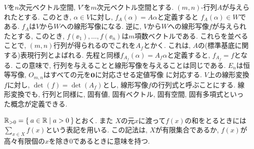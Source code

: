 $V$を$n$次元ベクトル空間, $V'$を$m$次元ベクトル空間とする.
$(m,n)$-行列$A$が与えられたとする.
このとき, $\alpha\in V$に対し, $f_A(\alpha)=A\alpha$と定義すると
$f_A(\alpha)\in W$である.
$f_A$は$V$から$W$への線形写像になる.
逆に,
$V$から$W$への線形写像$f$が与えられたとする,
このとき, $f(\ee_1),\ldots, f(\ee_n)$は$m$項数ベクトルである.
これらを並べることで, $(m,n)$行列が得られるのでこれを$A_f$とかく.
これは, $A$の(標準基底に関する)表現行列とよばれる.
先程と同様$f_{A_f}(\alpha)=A_f\alpha$と定義すると,
$f_{A_f}=f$となる.
この意味で, 行列を与えることと線形写像を与えることは同じである.
$E_n$は恒等写像, $O_{m,n}$はすべての元を$\boldsymbol{0}$に対応させる定値写像
に対応する.
$V$上の線形変換$f$に対し,
$\det(f)=\det(A_f)$とし, 線形写像$f$の行列式と呼ぶことにする.
線形変換でも, 行列と同様に, 
固有値, 固有ベクトル, 固有空間, 固有多項式といった概念が定義できる.

$\mathbb{R}_{>0}=\Set{a\in\mathbb{R}|a>0}$とおく.
また
$X$の元$x$に渡って$f(x)$の和をとるときには
$\sum_{x\in X}f(x)$という表記を用いる.
この記法は, $X$が有限集合であるか, $f(x)$が高々有限個の$x$を除き$0$であるときに意味を持つ.



